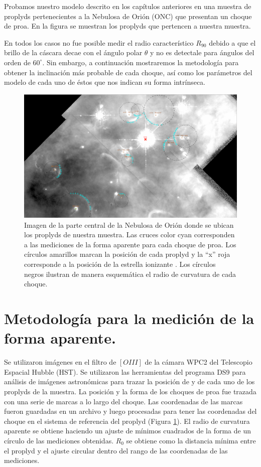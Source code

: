 Probamos nuestro modelo descrito en los capítulos anteriores en una muestra de
proplyds pertenecientes a la Nebulosa de Orión (ONC) que presentan un choque de
proa. En la figura  se muestran los proplyds que pertencen a nuestra muestra.

En todos los casos no fue posible medir el radio característico $R_{90}$ debido a
que el brillo de la cáscara decae con el ángulo polar $\theta$ y no es detectale
para ángulos del orden de $60^\circ$. Sin embargo, a continuación mostraremos la
metodología para obtener la inclinación más probable de cada choque, así como los
parámetros del modelo de cada uno de éstos que nos indican su forma intrínseca.

\begin{figure}
    \includegraphics[width=\linewidth]{./Figures/LV-full-field-annotated}
    \caption{Imagen de la parte central de la Nebulosa de Orión donde se ubican
    los proplyds de nuestra muestra. Las cruces color cyan corresponden a las
    mediciones de la forma aparente para cada choque de proa. Los círculos
    amarillos marcan la posición de cada proplyd y la ``x'' roja corresponde a la posición de la estrella ionizante \thC{}. Los círculos negros ilustran de manera esquemática el radio de curvatura de cada choque.}
    \label{fig:proplyds-map}
\end{figure}

\section{Metodología para la medición de la forma aparente.}
\label{sec:methodology}
Se utilizaron imágenes en el filtro de $[OIII]$ de la cámara WPC2 del Telescopio
Espacial Hubble (HST). Se utilizaron las herramientas del programa DS9 para
análisis de imágenes astronómicas para trazar la posición de \thC{} y de cada uno
de los proplyds de la muestra. La posición y la forma de los choques de proa fue
trazada con una serie de marcas a lo largo del choque. Las coordenadas de las marcas fueron guardadas en un archivo y luego procesadas para tener las
coordenadas del choque en el sistema de referencia del proplyd (Figura \ref{fig:proplyds-map}). El radio de curvatura aparente se obtiene haciendo un ajuste de mínimos cuadrados de la forma de un círculo de las mediciones obtenidas. $R_0$ se obtiene como la distancia mínima entre el proplyd y el ajuste circular dentro del rango de las coordenadas de las mediciones. 

